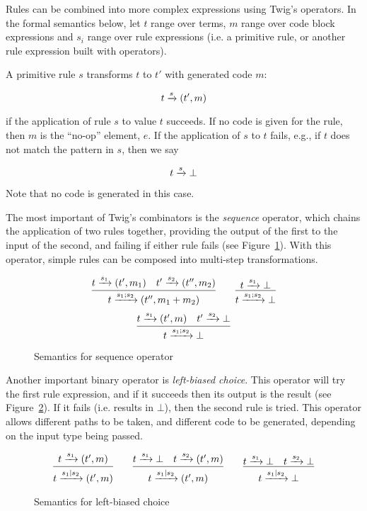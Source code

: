 Rules can be combined into more complex expressions using Twig's operators. In
the formal semantics below, let $t$ range over terms, $m$ range over code block
expressions and $s_i$ range over rule expressions (i.e. a primitive rule, or
another rule expression built with operators).

A primitive rule $s$ transforms $t$ to $t'$ with generated code $m$:

\[
t \xrightarrow{s} (t',m)
\]

if the application of rule $s$ to value $t$ succeeds. If no code is given for
the rule, then $m$ is the ``no-op'' element, $e$. If the application of $s$ to
$t$ fails, e.g., if $t$ does not match the pattern in $s$, then we say

\[
t \xrightarrow{s} \bot
\]

Note that no code is generated in this case.

The most important of Twig's combinators is the \emph{sequence} operator,
which chains the application of two rules together, providing the output of
the first to the input of the second, and failing if either rule fails (see
Figure~\ref{semantics:sequence}). With this operator, simple rules can be
composed into multi-step transformations.

\begin{figure}[ht]
\label{semantics:sequence}
\[
\infer{t \arr{s_1;s_2} (t'',m_1+m_2)}{t \arr{s_1} (t',m_1) \quad t' \arr{s_2} (t'',m_2)}
\qquad 
\infer{t \arr{s_1;s_2} \bot}{t \arr{s_1} \bot}
\]
\[
\infer{t \arr{s_1;s_2} \bot}{t \arr{s_1} (t',m) \quad t' \arr{s_2} \bot}
\]
\caption{Semantics for sequence operator}
\end{figure}

Another important binary operator is \emph{left-biased choice}. This operator
will try the first rule expression, and if it succeeds then its output is the
result (see Figure~\ref{semantics:choice}). If it fails (i.e. results in
$\bot$), then the second rule is tried. This operator allows different paths
to be taken, and different code to be generated, depending on the input type
being passed.

\begin{figure}[ht]
\label{semantics:choice}
\[
\infer{t \arr{s_1|s_2} (t',m)}{t \arr{s_1} (t',m)}
\qquad 
\infer{t \arr{s_1|s_2} (t',m)}{t \arr{s_1} \bot \quad t \arr{s_2} (t',m)}
\qquad
\infer{t \arr{s_1|s_2} \bot}{t \arr{s_1} \bot \quad t \arr{s_2} \bot}
\]
\caption{Semantics for left-biased choice}
\end{figure}

